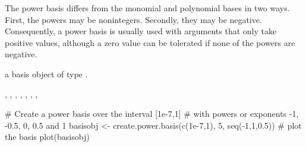 \begin{Details}\relax
The power basis differs from the monomial and polynomial
bases in two ways.  First, the powers may be nonintegers.
Secondly, they may be negative.  Consequently, a power
basis is usually used with arguments that only take
positive values, although a zero value can be tolerated
if none of the powers are negative.
\end{Details}
\begin{Value}
a basis object of type .
\end{Value}
\begin{SeeAlso}\relax
{}, 
, 
, 
, 
, 
, 
, 
\end{SeeAlso}
\begin{Examples}
\begin{ExampleCode}

#  Create a power basis over the interval [1e-7,1]
#  with powers or exponents -1, -0.5, 0, 0.5 and 1
basisobj <- create.power.basis(c(1e-7,1), 5, seq(-1,1,0.5))
#  plot the basis
plot(basisobj)

\end{ExampleCode}
\end{Examples}

